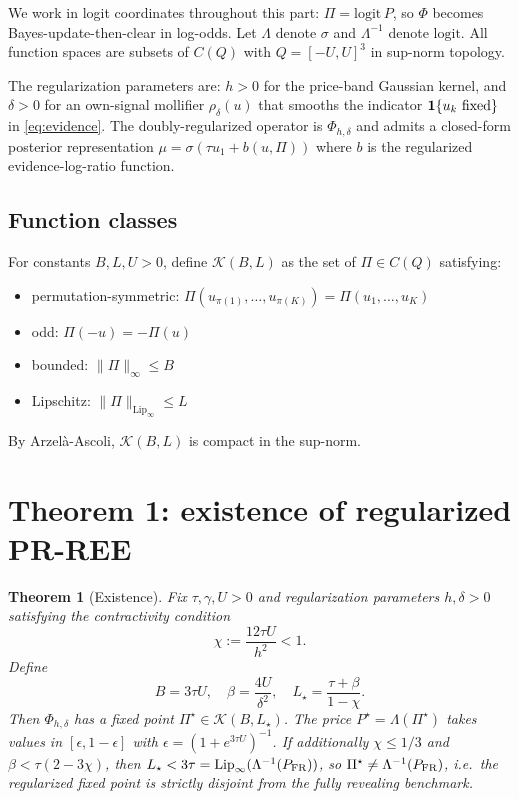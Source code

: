 \documentclass[11pt]{article}
\newtheorem{theorem}{Theorem}
\newcommand{\1}{\mathbf{1}}
\newcommand{\PFR}{P_{\rm FR}}
\begin{document}
We work in logit coordinates throughout this part: $\Pi = \mathrm{logit}\,P$,
so $\Phi$ becomes Bayes-update-then-clear in log-odds.  Let $\Lambda$
denote $\sigma$ and $\Lambda^{-1}$ denote $\mathrm{logit}$.  All function
spaces are subsets of $C(Q)$ with $Q=[-U,U]^3$ in sup-norm topology.

The regularization parameters are: $h>0$ for the price-band Gaussian
kernel, and $\delta>0$ for an own-signal mollifier $\rho_\delta(u)$
that smooths the indicator $\1\{u_k\ {\rm fixed}\}$ in
\eqref{eq:evidence}.  The doubly-regularized operator is
$\Phi_{h,\delta}$ and admits a closed-form posterior representation
$\mu = \sigma(\tau u_1 + b(u, \Pi))$ where $b$ is the regularized
evidence-log-ratio function.

\subsection{Function classes}

For constants $B, L, U > 0$, define $\mathcal{K}(B, L)$ as the set of
$\Pi \in C(Q)$ satisfying:
\begin{itemize}
\item permutation-symmetric: $\Pi(u_{\pi(1)},\ldots,u_{\pi(K)}) = \Pi(u_1,\ldots,u_K)$
\item odd: $\Pi(-u) = -\Pi(u)$
\item bounded: $\|\Pi\|_\infty \le B$
\item Lipschitz: $\|\Pi\|_{\mathrm{Lip}_\infty} \le L$
\end{itemize}
By Arzel\`a-Ascoli, $\mathcal{K}(B, L)$ is compact in the sup-norm.

\section{Theorem 1: existence of regularized PR-REE}

\begin{theorem}[Existence]\label{thm:existence}
Fix $\tau, \gamma, U > 0$ and regularization parameters $h, \delta > 0$
satisfying the contractivity condition
\begin{equation}
\chi := \frac{12 \tau U}{h^2} < 1.
\label{eq:chi}
\end{equation}
Define
\begin{equation}
B = 3 \tau U,
\quad
\beta = \frac{4U}{\delta^2},
\quad
L_\star = \frac{\tau + \beta}{1 - \chi}.
\end{equation}
Then $\Phi_{h, \delta}$ has a fixed point $\Pi^\star \in \mathcal{K}(B, L_\star)$.
The price $P^\star = \Lambda(\Pi^\star)$ takes values in $[\epsilon, 1-\epsilon]$ with
$\epsilon = (1 + e^{3\tau U})^{-1}$.  If additionally $\chi \le 1/3$ and
$\beta < \tau(2 - 3\chi)$, then $L_\star < 3\tau = \mathrm{Lip}_\infty(\Lambda^{-1}(\PFR))$,
so $\Pi^\star \ne \Lambda^{-1}(\PFR)$, i.e.\ the regularized fixed point is
strictly disjoint from the fully revealing benchmark.
\end{theorem}
\end{document}
